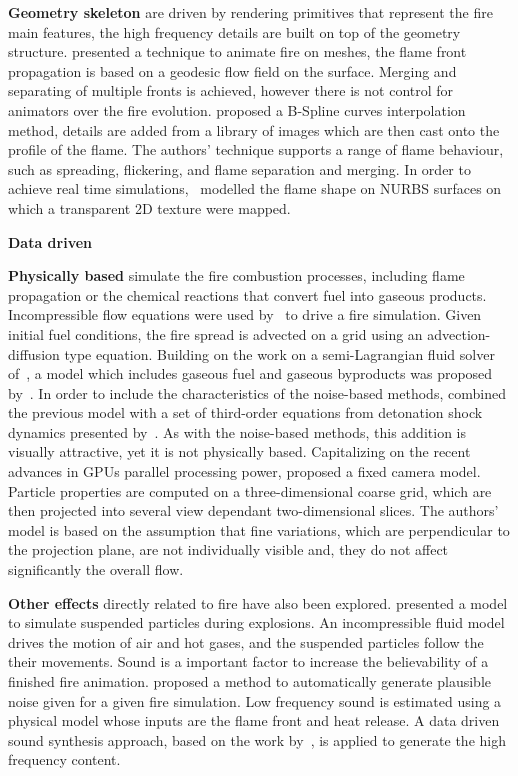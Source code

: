 \textbf{Geometry skeleton} are driven by rendering primitives that represent the fire main features, the high frequency details are built on top of the geometry structure.
\cite{Lee:2001} presented a technique to animate fire on meshes, the flame front propagation is based on a geodesic flow field on the surface.
Merging and separating of multiple fronts is achieved, however there is not control for animators over the fire evolution. 
\cite{Lamorlette:2002} proposed a B-Spline curves interpolation method, details are added from a library of images which are then cast onto the profile of the flame.
The authors' technique supports a range of flame behaviour, such as spreading, flickering, and flame separation and merging.
In order to achieve real time simulations,~\cite{Bridault:2006} modelled the flame shape on NURBS surfaces on which a transparent 2D texture were mapped.

\textbf{Data driven}

\textbf{Physically based} simulate the fire combustion processes, including flame propagation or the chemical reactions that convert fuel into gaseous products.  
Incompressible flow equations were used by~\cite{Stam:1995} to drive a fire simulation.
Given initial fuel conditions, the fire spread is advected on a grid using an advection-diffusion type equation.
Building on the work on a semi-Lagrangian fluid solver of~\cite{Stam:1999}, a model which includes gaseous fuel and gaseous byproducts was proposed by~\cite{Nguyen:2002}.
In order to include the characteristics of the noise-based methods, \cite{Hong:2007} combined the previous model with a set of third-order equations from detonation shock dynamics presented by~\cite{Yao:1996}.
As with the noise-based methods, this addition is visually attractive, yet it is not physically based. 
Capitalizing on the recent advances in GPUs parallel processing power, \cite{Horvath:2009} proposed a fixed camera model.
Particle properties are computed on a three-dimensional coarse grid, which are then projected into several view dependant two-dimensional slices.
The authors' model is based on the assumption that fine variations, which are perpendicular to the projection plane, are not individually visible and, they do not affect significantly the overall flow.
 
\textbf{Other effects} directly related to fire have also been explored.
\cite{Feldman:2003} presented a model to simulate suspended particles during explosions.
An incompressible fluid model drives the motion of air and hot gases, and the suspended particles follow the their movements.
Sound is a important factor to increase the believability of a finished fire animation.
\cite{Chadwick:2011} proposed a method to automatically generate plausible noise given for a given fire simulation.
Low frequency sound is estimated using a physical model whose inputs are the flame front and heat release.
A data driven sound synthesis approach, based on the work by~\cite{Wei:2000}, is applied to generate the high frequency content.

